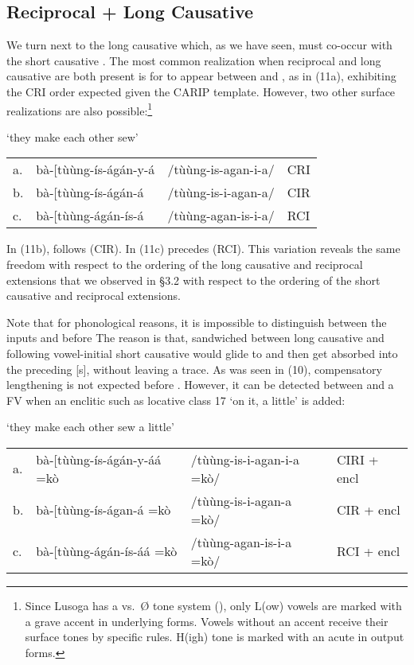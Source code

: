 \documentclass[output=paper,
modfonts
]{LSP/langsci}
\begin{document}
\subsection{Reciprocal + Long Causative}

We turn next to the long causative  which, as we have seen,
must co-occur with the short causative . The most common
realization when reciprocal and long causative are both present is for
 to appear between  and , as in (11a),
exhibiting the CRI order expected given the CARIP template. However, two
other surface realizations are also possible:\footnote{Since Lusoga has
  a  vs.\ Ø tone system (\citet{hyman2016}), only L(ow) vowels are marked
  with a grave accent in underlying forms. Vowels without an accent
  receive their surface tones by specific rules. H(igh) tone is marked
  with an acute in output forms.}

\ea `they make each other sew' \\
\begin{tabular}{@{}llll@{}}
a. & bà-{[}tùùng-ís-ágán-y-á & /tùùng-is-agan-i-a/ & CRI\\
b. & bà-{[}tùùng-ís-ágán-á & /tùùng-is-i-agan-a/ & CIR\\
c. & bà-{[}tùùng-ágán-ís-á & /tùùng-agan-is-i-a/ & RCI\\
\end{tabular}
\z

\noindent In (11b),  follows  (CIR). In (11c)
 precedes  (RCI). This variation reveals the
same freedom with respect to the ordering of the long causative and
reciprocal extensions that we observed in §3.2 with respect to the
ordering of the short causative and reciprocal extensions.

Note that for phonological reasons, it is impossible to distinguish
between the inputs  and  before 
The reason is that, sandwiched between long causative  and
following vowel-initial  short causative  would
glide to  and then get absorbed into the preceding {[}s{]},
without leaving a trace. As was seen in (10), compensatory lengthening
is not expected before . However, it can be detected
between  and a FV when an enclitic such as locative class 17
 `on it, a little' is added:

\ea `they make each other sew a little'\\
\begin{tabular}[t]{@{}llll@{}}
a. & bà-{[}tùùng-ís-ágán-y-áá =kò & /tùùng-is-i-agan-i-a =kò/ & CIRI + encl\\
b. & bà-{[}tùùng-ís-ágan-á =kò & /tùùng-is-i-agan-a =kò/ & CIR + encl\\
c. & bà-{[}tùùng-ágán-ís-áá =kò & /tùùng-agan-is-i-a =kò/ & RCI + encl\\
\end{tabular}
\z
\end{document}
